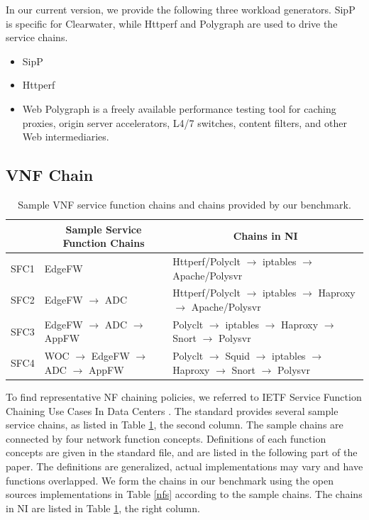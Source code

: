 In our current version, we provide the following three workload generators.
SipP is specific for Clearwater, 
while Httperf and Polygraph are used to drive the service chains.
\begin{itemize}
\item{}
SipP \cite{}
\item{}
Httperf \cite{}
\item{}
Web Polygraph \cite{}
is a freely available performance testing tool for caching proxies, origin server accelerators, L4/7 switches, content filters, and other Web intermediaries.
\end{itemize}

\subsection{VNF Chain}

\begin{table}[!t]
\newcommand{\tabincell}[2]{\begin{tabular}{@{}#1@{}}#2\end{tabular}}
\centering
\begin{tabular}{|l|l|l|}\hline
\textbf{} & \multicolumn{1}{c|}{\textbf{Sample Service Function Chains}} & \multicolumn{1}{c|}{\textbf{Chains in NI}} \\\hline
SFC1 & EdgeFW & Httperf/Polyclt $\to$ iptables $\to$ Apache/Polysvr \\\hline
SFC2 & EdgeFW $\to$ ADC & Httperf/Polyclt $\to$ iptables $\to$ Haproxy $\to$ Apache/Polysvr \\\hline
SFC3 & EdgeFW $\to$ ADC $\to$ AppFW & Polyclt $\to$ iptables $\to$ Haproxy $\to$ Snort $\to$ Polysvr \\\hline
SFC4 & WOC $\to$ EdgeFW $\to$ ADC $\to$ AppFW & Polyclt $\to$  Squid $\to$ iptables $\to$ Haproxy $\to$ Snort $\to$ Polysvr \\\hline
\end{tabular}
\caption{Sample VNF service function chains and chains provided by our benchmark.}
\label{chains}
\end{table}

To find representative NF chaining policies,
we referred to IETF Service Function Chaining Use Cases
In Data Centers \cite{draft-ietf-sfc-dc-use-cases-06}.
The standard provides several sample service chains,
as listed in Table \ref{chains}, the second column.
The sample chains are connected by four network function concepts.
Definitions of each function concepts are given in the standard file,
and are listed in the following part of the paper.
The definitions are generalized,
actual implementations may vary and have functions overlapped.
We form the chains in our benchmark using the open sources
implementations in Table \ref{nfs} according to the sample chains.
The chains in NI are listed in Table \ref{chains}, the right column.

